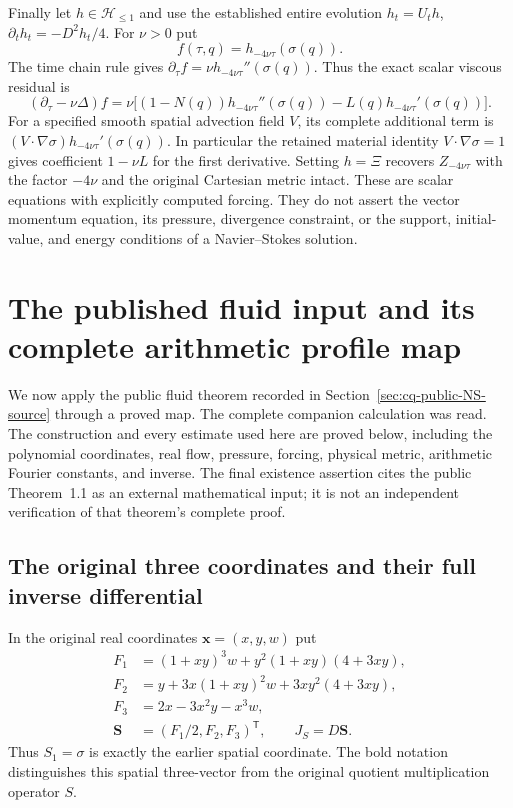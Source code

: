 Finally let $h\in\mathcal H_{\le1}$ and use the established entire
evolution $h_t=U_th$, $\partial_th_t=-D^2h_t/4$. For $\nu>0$ put
\[
 f(\tau,q)=h_{-4\nu\tau}(\sigma(q)).
\]
The time chain rule gives
$\partial_\tau f=\nu h_{-4\nu\tau}''(\sigma(q))$.
Thus the exact scalar viscous residual is
\begin{equation}
 (\partial_\tau-\nu\Delta)f
 =\nu\bigl[(1-N(q))h_{-4\nu\tau}''(\sigma(q))
          -L(q)h_{-4\nu\tau}'(\sigma(q))\bigr].
 \label{eq:cq-spatial-viscous-residual}
\end{equation}
For a specified smooth spatial advection field $V$, its complete
additional term is
$(V\cdot\nabla\sigma)h_{-4\nu\tau}'(\sigma(q))$.
In particular the retained material identity $V\cdot\nabla\sigma=1$
gives coefficient $1-\nu L$ for the first derivative.
Setting $h=\Xi$ recovers $Z_{-4\nu\tau}$ with the factor $-4\nu$
and the original Cartesian metric intact. These are scalar equations
with explicitly computed forcing. They do not assert the vector
momentum equation, its pressure, divergence constraint, or the support,
initial-value, and energy conditions of a Navier--Stokes solution.

\section{The published fluid input and its complete arithmetic profile map}
\label{sec:cq-NS-profile-transfer}

We now apply the public fluid theorem recorded in
Section~\ref{sec:cq-public-NS-source} through a proved map.
The complete companion calculation \cite{cqNSFlow} was read.
The construction and every estimate used here are proved below,
including the polynomial coordinates, real flow, pressure,
forcing, physical metric, arithmetic Fourier constants, and inverse.
The final existence assertion cites the public Theorem~1.1 as
an external mathematical input; it is not an independent
verification of that theorem's complete proof.

\subsection{The original three coordinates and their full inverse differential}

In the original real coordinates $\mathbf x=(x,y,w)$ put
\begin{equation}
\begin{aligned}
 F_1&=(1+xy)^3w+y^2(1+xy)(4+3xy),\\
 F_2&=y+3x(1+xy)^2w+3xy^2(4+3xy),\\
 F_3&=2x-3x^2y-x^3w,\\
 \mathbf S&=(F_1/2,F_2,F_3)^{\mathsf T},\qquad J_S=D\mathbf S .
\end{aligned}
\label{eq:cq-NS-original-S}
\end{equation}
Thus $S_1=\sigma$ is exactly the earlier spatial coordinate.
The bold notation distinguishes this spatial three-vector
from the original quotient multiplication operator $S$.

